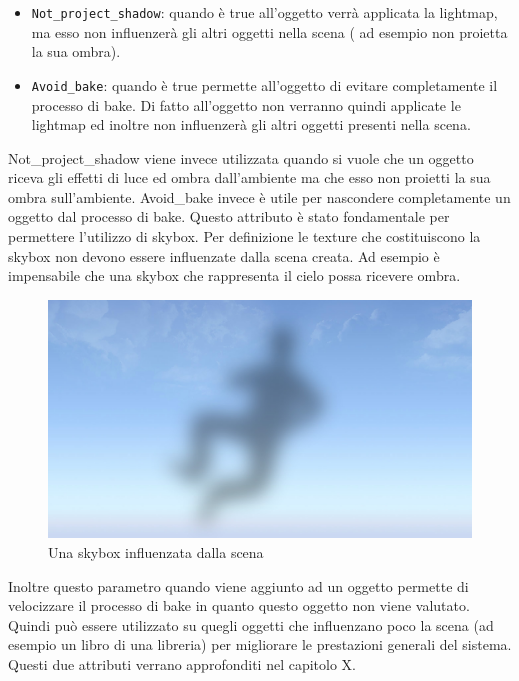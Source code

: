 \begin{itemize}
\item \texttt{Not\_project\_shadow}: quando è true all’oggetto verrà applicata la lightmap, ma esso non influenzerà gli altri oggetti nella scena ( ad esempio non proietta la sua ombra).
\item \texttt{Avoid\_bake}: quando è true permette all’oggetto di evitare completamente il processo di bake. Di fatto all’oggetto non verranno quindi applicate le lightmap ed inoltre non influenzerà gli altri oggetti presenti nella scena.
\end{itemize}
Not\_project\_shadow viene invece utilizzata quando si vuole che un oggetto riceva gli effetti di luce ed ombra dall’ambiente ma che esso non proietti la sua ombra sull’ambiente.
Avoid\_bake invece è utile per nascondere completamente un oggetto dal processo di bake. Questo attributo è stato fondamentale per permettere l’utilizzo di skybox. Per definizione le texture che costituiscono la skybox non devono essere influenzate dalla scena creata. Ad esempio è impensabile che una skybox che rappresenta il cielo possa ricevere ombra.
\begin{figure}[htb]
 \centering
 \includegraphics[width=1\linewidth]{images/chapter_architettura_sistema/skybox.jpg}\hfill
 \caption[Esempio di skybox influenzata dalla scena]{Una skybox influenzata dalla scena}
 \label{fig:architettura_sistema_skybox}
\end{figure}
Inoltre questo parametro quando viene aggiunto ad un oggetto permette di velocizzare il processo di bake in quanto questo oggetto non viene valutato. Quindi può essere utilizzato su quegli oggetti che influenzano poco la scena (ad esempio un libro di una libreria) per migliorare le prestazioni generali del sistema. Questi due attributi verrano approfonditi nel capitolo X.